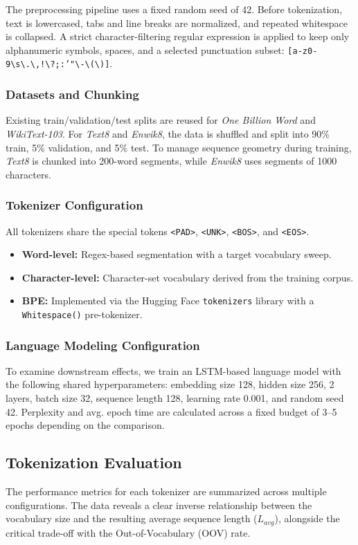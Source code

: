 The preprocessing pipeline uses a fixed random seed of 42. Before tokenization, text is lowercased, tabs and line breaks are normalized, and repeated whitespace is collapsed. A strict character-filtering regular expression is applied to keep only alphanumeric symbols, spaces, and a selected punctuation subset: \texttt{[a-z0-9\textbackslash s\textbackslash .\textbackslash ,!\textbackslash ?;:'"\textbackslash -\textbackslash (\textbackslash )]}.

\subsubsection{Datasets and Chunking}
Existing train/validation/test splits are reused for \textit{One Billion Word} and \textit{WikiText-103}. For \textit{Text8} and \textit{Enwik8}, the data is shuffled and split into 90\% train, 5\% validation, and 5\% test. To manage sequence geometry during training, \textit{Text8} is chunked into 200-word segments, while \textit{Enwik8} uses segments of 1000 characters.

\subsubsection{Tokenizer Configuration}
All tokenizers share the special tokens \texttt{<PAD>}, \texttt{<UNK>}, \texttt{<BOS>}, and \texttt{<EOS>}.
\begin{itemize}
    \item \textbf{Word-level:} Regex-based segmentation with a target vocabulary sweep.
    \item \textbf{Character-level:} Character-set vocabulary derived from the training corpus.
    \item \textbf{BPE:} Implemented via the Hugging Face \texttt{tokenizers} library with a \texttt{Whitespace()} pre-tokenizer.
\end{itemize}

\subsubsection{Language Modeling Configuration}
To examine downstream effects, we train an LSTM-based language model with the following shared hyperparameters: embedding size 128, hidden size 256, 2 layers, batch size 32, sequence length 128, learning rate 0.001, and random seed 42. Perplexity and avg. epoch time are calculated across a fixed budget of 3--5 epochs depending on the comparison.

\subsection{Tokenization Evaluation}
The performance metrics for each tokenizer are summarized across multiple configurations. The data reveals a clear inverse relationship between the vocabulary size and the resulting average sequence length ($L_{avg}$), alongside the critical trade-off with the Out-of-Vocabulary (OOV) rate.

